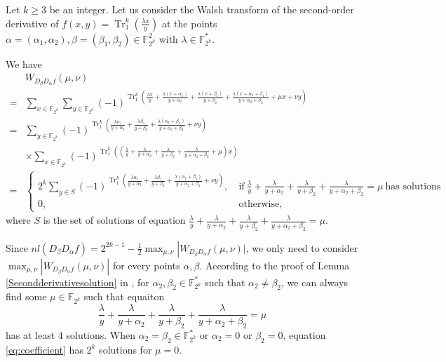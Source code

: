 \documentclass{article}
\newcommand{\F}{\mathbb{F}}
\newcommand{\TRACE}{\operatorname{Tr}_1^k}
\theoremstyle{nonumberplain}
\newcommand{\0}{\textbf{0}}
\newcommand{\1}{\textbf{1}}
\begin{document}
    Let $ k\ge 3 $ be an integer. 
    Let us consider the Walsh transform of the second-order derivative of 
    $ f(x,y)=\TRACE\left(\frac{\lambda x}{y}\right) $ at the points 
    $ \alpha=(\alpha_1,\alpha_2),\beta=(\beta_1,\beta_2)\in\F_{2^k}^2 $ with $ \lambda\in\F_{2^k}^* $.

    We have 
    \begin{align}\label{eq:secondordersum}
        &W_{D_{\beta}D_{\alpha}f}(\mu,\nu)\nonumber\\
        =&\sum_{x\in\F_{2^k}}\sum_{y\in\F_{2^k}}(-1)^{\TRACE\left(\frac{\lambda x}{y}+\frac{\lambda (x+\alpha_1)}{y+\alpha_2}+\frac{\lambda (x+\beta_1)}{y+\beta_2}+\frac{\lambda (x+\alpha_1+\beta_1)}{y+\alpha_2+\beta_2}+\mu x+\nu y\right)}\nonumber\\
        =&\sum_{y\in\F_{2^k}}(-1)^{\TRACE\left(\frac{\lambda\alpha_1}{y+\alpha_2}+\frac{\lambda\beta_1}{y+\beta_2}+\frac{\lambda(\alpha_1+\beta_1)}{y+\alpha_2+\beta_2}+\nu y\right)}\nonumber\\
        &\times \sum_{x\in\F_{2^k}}(-1)^{\TRACE\left(\left(\frac{\lambda}{y}+\frac{\lambda}{y+\alpha_2}+\frac{\lambda}{y+\beta_2}+\frac{\lambda}{y+\alpha_2+\beta_2}+\mu\right)x\right)}\nonumber\\
        =&\begin{cases}
            2^k\sum_{y\in S}(-1)^{\TRACE\left(\frac{\lambda\alpha_1}{y+\alpha_2}+\frac{\lambda\beta_1}{y+\beta_2}+\frac{\lambda(\alpha_1+\beta_1)}{y+\alpha_2+\beta_2}+\nu y\right)},&~\text{if}~\frac{\lambda}{y}+\frac{\lambda}{y+\alpha_2}+\frac{\lambda}{y+\beta_2}+\frac{\lambda}{y+\alpha_2+\beta_2}=\mu~\text{has solutions}\\
            0, &~\text{otherwise}, 
        \end{cases}
    \end{align}
    where $ S $ is the set of solutions of equation 
    $ \frac{\lambda}{y}+\frac{\lambda}{y+\alpha_2}+\frac{\lambda}{y+\beta_2}+\frac{\lambda}{y+\alpha_2+\beta_2}=\mu $.

    Since $ nl(D_{\beta}D_{\alpha}f)=2^{2k-1}-\frac{1}{2}\max_{\mu,\nu}\left\lvert W_{D_{\beta}D_{\alpha}f}(\mu,\nu)\rvert\right. $, 
    we only need to consider $ \max_{\mu,\nu}|W_{D_{\beta}D_{\alpha}f}(\mu,\nu)| $ for every points 
    $ \alpha,\beta $. 
    According to the proof of Lemma \ref{Secondderivativesolution} in , 
    for $ \alpha_2,\beta_2\in\F_{2^k}^* $ such that $ \alpha_2\ne\beta_2 $, 
    we can always find some $ \mu\in\F_{2^k} $ such that equaiton
    \begin{equation}\label{eq:coefficient}
        \frac{\lambda}{y}+\frac{\lambda}{y+\alpha_2}+\frac{\lambda}{y+\beta_2}+\frac{\lambda}{y+\alpha_2+\beta_2}=\mu
    \end{equation}
    has at least $ 4 $ solutions. 
    When $ \alpha_2=\beta_2\in\F_{2^k}^* $ or $ \alpha_2=0 $ or $ \beta_2=0 $, 
    equation \eqref{eq:coefficient} has $ 2^k $ solutions for $ \mu=0 $.
\end{document}
